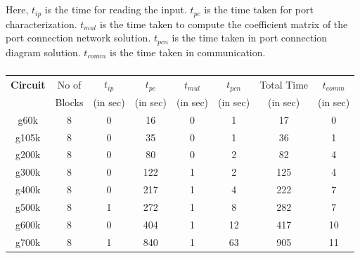 \documentclass[10pt,psfig,letterpaper,twocolumn]{article}
\begin{document}
\subsection*{}
Here, $t_{ip}$ is the time for reading the input. $t_{pc}$ is the time taken for port characterization. 
$t_{mul}$ is the time taken to compute the coefficient matrix of the
port connection network solution. $t_{pcn}$ is the time taken in port connection diagram solution. 
$t_{comm}$ is the time taken in communication.

\subsubsection*{}
\begin{table}[!ht]
\begin{center}
\begin{tabular}{|c|c|c|c|c|c|c|c|} 
\hline
{\bf Circuit} & No of & $t_{ip}$ & $t_{pc}$ & $t_{mul}$ &  $t_{pcn}$ & Total Time & $t_{comm}$ \\ 
              & Blocks& (in sec)& (in sec)  & (in sec)  &  (in sec)  & (in sec)   & (in sec)   \\ \hline 
g60k&  8 &0 &16& 0&1& 17& 0\\ \hline 
g105k& 8 &0 &35& 0&1& 36& 1\\ \hline 
g200k& 8 &0 &80& 0&2& 82& 4\\ \hline 
g300k& 8 &0 &122&1&2& 125&4\\ \hline 
g400k& 8 &0 &217&1&4& 222&7\\ \hline 
g500k& 8 &1 &272&1&8& 282&7\\ \hline 
g600k& 8 &0 &404&1&12&417&10\\ \hline 
g700k& 8 &1 &840&1&63&905&11\\ \hline
\end {tabular}
\end {center}
\end {table}
\end{document}
